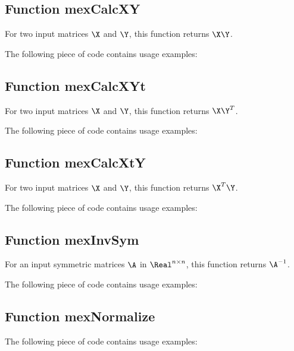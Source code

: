 \documentclass[a4paper, 11pt]{article}
\begin{document}
\subsection{Function mexCalcXY}
For two input matrices $\X$ and $\Y$, this function returns $\X\Y$. 
%    

The following piece of code contains usage examples:




\subsection{Function mexCalcXYt}
For two input matrices $\X$ and $\Y$, this function returns $\X\Y^T$.
%    

The following piece of code contains usage examples:




\subsection{Function mexCalcXtY}
For two input matrices $\X$ and $\Y$, this function returns $\X^T\Y$.
%    

The following piece of code contains usage examples:




\subsection{Function mexInvSym}
For an input symmetric matrices $\A$ in $\Real^{n \times n}$, this function returns $\A^{-1}$.
%    

The following piece of code contains usage examples:



\subsection{Function mexNormalize}
%    

The following piece of code contains usage examples:

\end{document}
